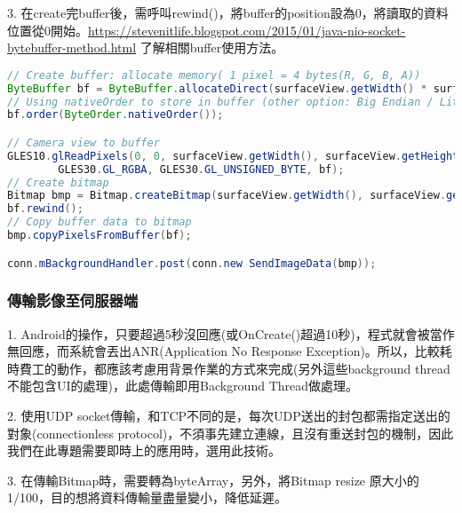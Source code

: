 3. 在create完buffer後，需呼叫rewind()，將buffer的position設為0，將讀取的資料位置從0開始。\href{可於此處}{https://stevenitlife.blogspot.com/2015/01/java-nio-socket-bytebuffer-method.html} 了解相關buffer使用方法。

\begin{lstlisting}[language=Java, caption=手機後相機影像擷取]
// Create buffer: allocate memory( 1 pixel = 4 bytes(R, G, B, A))
ByteBuffer bf = ByteBuffer.allocateDirect(surfaceView.getWidth() * surfaceView.getHeight() * 4);
// Using nativeOrder to store in buffer (other option: Big Endian / Little Endian)
bf.order(ByteOrder.nativeOrder());

// Camera view to buffer
GLES10.glReadPixels(0, 0, surfaceView.getWidth(), surfaceView.getHeight(),
        GLES30.GL_RGBA, GLES30.GL_UNSIGNED_BYTE, bf);
// Create bitmap
Bitmap bmp = Bitmap.createBitmap(surfaceView.getWidth(), surfaceView.getHeight(), Bitmap.Config.ARGB_8888);
bf.rewind();
// Copy buffer data to bitmap
bmp.copyPixelsFromBuffer(bf);

conn.mBackgroundHandler.post(conn.new SendImageData(bmp));
\end{lstlisting}

\subsubsection{傳輸影像至伺服器端}
1. Android的操作，只要超過5秒沒回應(或OnCreate()超過10秒)，程式就會被當作無回應，而系統會丟出ANR(Application No Response Exception)。所以，比較耗時費工的動作，都應該考慮用背景作業的方式來完成(另外這些background thread不能包含UI的處理)，此處傳輸即用Background Thread做處理。

2. 使用UDP socket傳輸，和TCP不同的是，每次UDP送出的封包都需指定送出的對象(connectionless protocol)，不須事先建立連線，且沒有重送封包的機制，因此我們在此專題需要即時上的應用時，選用此技術。

3. 在傳輸Bitmap時，需要轉為byteArray，另外，將Bitmap resize 原大小的1/100，目的想將資料傳輸量盡量變小，降低延遲。

